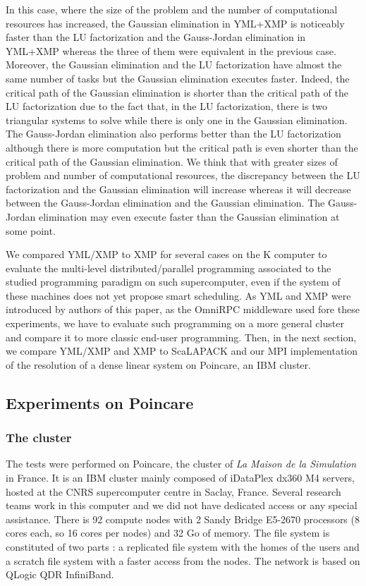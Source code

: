 In this case, where the size of the problem and the number of computational resources has increased, the Gaussian elimination in YML+XMP is noticeably faster than the LU factorization and the Gauss-Jordan elimination in YML+XMP whereas the three of them were equivalent in the previous case.
Moreover, the Gaussian elimination and the LU factorization have almost the same number of tasks but the Gaussian elimination executes faster.
Indeed, the critical path of the Gaussian elimination is shorter than the critical path of the LU factorization due to the fact that, in the LU factorization, there is two triangular systems to solve while there is only one in the Gaussian elimination.
The Gauss-Jordan elimination also performs better than the LU factorization although there is more computation but the critical path is even shorter than the critical path of the Gaussian elimination.
We think that with greater sizes of problem and number of computational resources, the discrepancy between the LU factorization and the Gaussian elimination will increase whereas it will decrease between the Gauss-Jordan elimination and the Gaussian elimination.
The Gauss-Jordan elimination may even execute faster than the Gaussian elimination at some point.


We compared YML/XMP to XMP for several cases on the K computer to evaluate the multi-level distributed/parallel programming associated to the studied programming paradigm on such supercomputer, even if the system of these machines does not yet propose smart scheduling.
As YML and XMP were introduced by authors of this paper, as the OmniRPC middleware used fore these experiments, we have to evaluate such programming on a more general cluster and compare it to more classic end-user programming.
Then, in the next section, we compare YML/XMP and XMP to ScaLAPACK and our MPI implementation of the resolution of a dense linear system on Poincare, an IBM cluster.


\subsection{Experiments on Poincare\label{sec:exp}}

\subsubsection{The cluster}
The tests were performed on Poincare, the cluster of \textit{La Maison de la Simulation} in France.
It is an IBM cluster mainly composed of iDataPlex dx360 M4 servers, hosted at the CNRS supercomputer centre in Saclay, France.
Several research teams work in this computer and we did not have dedicated access or any special assistance.
There is 92 compute nodes with 2 Sandy Bridge E5-2670 processors (8 cores each, so 16 cores per nodes) and 32 Go of memory.
The file system is constituted of two parts : a replicated file system with the homes of the users and a scratch file system with a faster access from the nodes.
The network is based on QLogic QDR InfiniBand.

